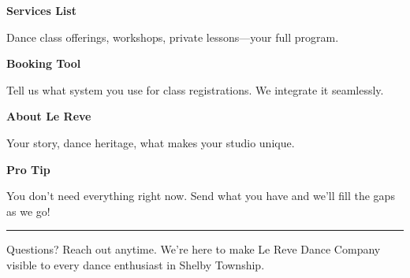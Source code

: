 \documentclass[11pt,letterpaper]{article}
\begin{document}
\hfill
\begin{minipage}[t]{0.48\textwidth}
\begin{tcolorbox}[colframe=accent-teal, boxrule=1pt, left=0.7em, right=0.7em, top=0.5em, bottom=0.5em, arc=4pt, boxsep=0pt]
{\bfseries\small\color{accent-teal}Services List}

\vspace{0.15em}

{\small Dance class offerings, workshops, private lessons—your full program.}
\end{tcolorbox}

\vspace{0.1em}

\begin{tcolorbox}[colframe=accent-teal, boxrule=1pt, left=0.7em, right=0.7em, top=0.5em, bottom=0.5em, arc=4pt, boxsep=0pt]
{\bfseries\small\color{accent-teal}Booking Tool}

\vspace{0.15em}

{\small Tell us what system you use for class registrations. We integrate it seamlessly.}
\end{tcolorbox}

\vspace{0.1em}

\begin{tcolorbox}[colframe=accent-teal, boxrule=1pt, left=0.7em, right=0.7em, top=0.5em, bottom=0.5em, arc=4pt, boxsep=0pt]
{\bfseries\small\color{accent-teal}About Le Reve}

\vspace{0.15em}

{\small Your story, dance heritage, what makes your studio unique.}
\end{tcolorbox}

\vspace{-0.2em}
\end{minipage}

\vspace{0.15em}

\begin{tcolorbox}[colback={accent-red!5}, colframe=accent-red!20, boxrule=0.5pt, left=0.7em, right=0.7em, top=0.4em, bottom=0.4em, arc=6pt, boxsep=0pt]

{\bfseries\small\color{accent-red}Pro Tip}

\vspace{0.1em}

{\small You don't need everything right now. Send what you have and we'll fill the gaps as we go!}

\end{tcolorbox}

\vspace{0.15em}

\noindent\hrule
\vspace{0.2em}

{\small\color{text-light}Questions? Reach out anytime. We're here to make Le Reve Dance Company visible to every dance enthusiast in Shelby Township.}
\end{document}
